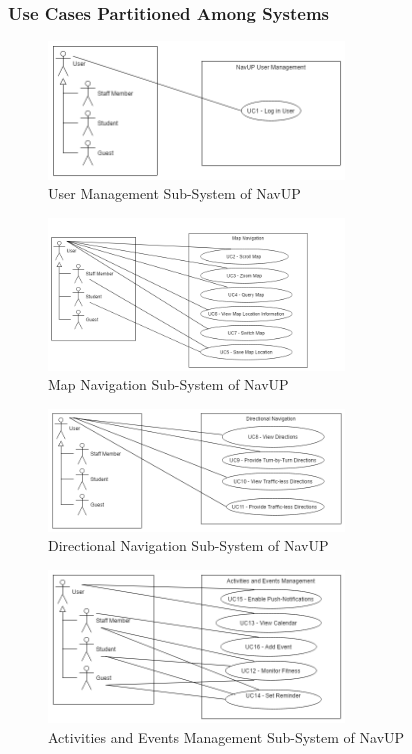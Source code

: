 \documentclass[runningheads,a4paper]{article}
\begin{document}
\pagebreak

\subsubsection{Use Cases Partitioned Among Systems}

\begin{figure}[H]
   	\centering
   	\includegraphics[width=0.7\textwidth]{UserManagement.jpg}
   	\caption{User Management Sub-System of NavUP}
\end{figure}

\begin{figure}[H]
   	\centering
   	\includegraphics[width=0.7\textwidth]{MapNavigation.jpg}
   	\caption{Map Navigation Sub-System of NavUP}
\end{figure}

\begin{figure}[H]
   	\centering
   	\includegraphics[width=0.7\textwidth]{DirectionalNavigation.jpg}
   	\caption{Directional Navigation Sub-System of NavUP}
\end{figure}

\begin{figure}[H]
   	\centering
   	\includegraphics[width=0.7\textwidth]{ActivitiesAndEventsManagement.jpg}
   	\caption{Activities and Events Management Sub-System of NavUP}
\end{figure}
\end{document}
